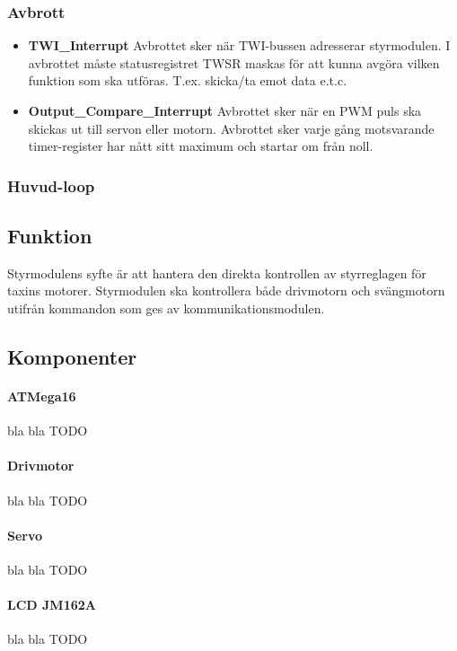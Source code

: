\documentclass[designspec/spec.tex]{subfiles}
\begin{document}
\subsubsection{Avbrott}

\begin{itemize}
    \item \textbf{TWI\_Interrupt} Avbrottet sker när TWI-bussen adresserar
    styrmodulen. I avbrottet måste statusregistret TWSR maskas för att kunna
    avgöra vilken funktion som ska utföras. T.ex. skicka/ta emot data e.t.c. 

    \item \textbf{Output\_Compare\_Interrupt} Avbrottet sker när en PWM puls
    ska skickas ut till servon eller motorn. Avbrottet sker varje gång
    motsvarande timer-register har nått sitt maximum och startar om från noll. 
\end{itemize}
\subsubsection{Huvud-loop}

\subsection{Funktion}
Styrmodulens syfte är att hantera den direkta kontrollen av styrreglagen för
taxins motorer. Styrmodulen ska kontrollera både drivmotorn och svängmotorn
utifrån kommandon som ges av kommunikationsmodulen.

\subsection{Komponenter}
\paragraph{ATMega16} bla bla TODO
\paragraph{Drivmotor} bla bla TODO
\paragraph{Servo} bla bla TODO
\paragraph{LCD JM162A} bla bla TODO
\end{document}
